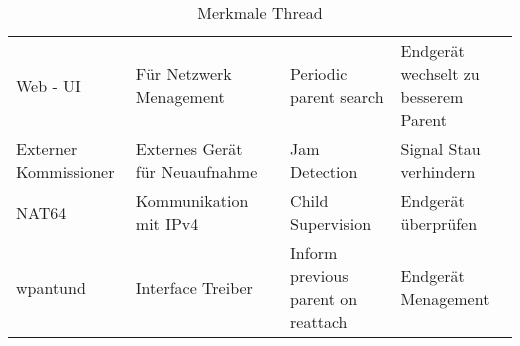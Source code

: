 \begin{table}[H]
\begin{adjustbox}{width=1\textwidth}
\begin{tabular}{@{}lllll@{}}
		\multicolumn{1}{|l|}{Web - UI}              & \multicolumn{1}{l|}{Für Netzwerk Menagement}           & \multicolumn{1}{l|}{} & \multicolumn{1}{l|}{Periodic parent search}             & \multicolumn{1}{l|}{Endgerät wechselt zu besserem Parent} \\ \cmidrule(r){1-2} \cmidrule(l){4-5} 
		\multicolumn{1}{|l|}{Externer Kommissioner} & \multicolumn{1}{l|}{Externes Gerät für Neuaufnahme}    & \multicolumn{1}{l|}{} & \multicolumn{1}{l|}{Jam Detection}                      & \multicolumn{1}{l|}{Signal Stau verhindern}               \\ \cmidrule(r){1-2} \cmidrule(l){4-5} 
		\multicolumn{1}{|l|}{NAT64}                 & \multicolumn{1}{l|}{Kommunikation mit IPv4}            & \multicolumn{1}{l|}{} & \multicolumn{1}{l|}{Child Supervision}                  & \multicolumn{1}{l|}{Endgerät überprüfen}                  \\ \cmidrule(r){1-2} \cmidrule(l){4-5} 
		\multicolumn{1}{|l|}{wpantund}              & \multicolumn{1}{l|}{Interface Treiber}                 & \multicolumn{1}{l|}{} & \multicolumn{1}{l|}{Inform previous parent on reattach} & \multicolumn{1}{l|}{Endgerät Menagement}                  \\ \cmidrule(r){1-2} \cmidrule(l){4-5} 
	\end{tabular}
	\end{adjustbox}
	\caption{Merkmale Thread \cite{thread_group_what_2020}}
	\label{table:MerkmaleThread}
\end{table}

